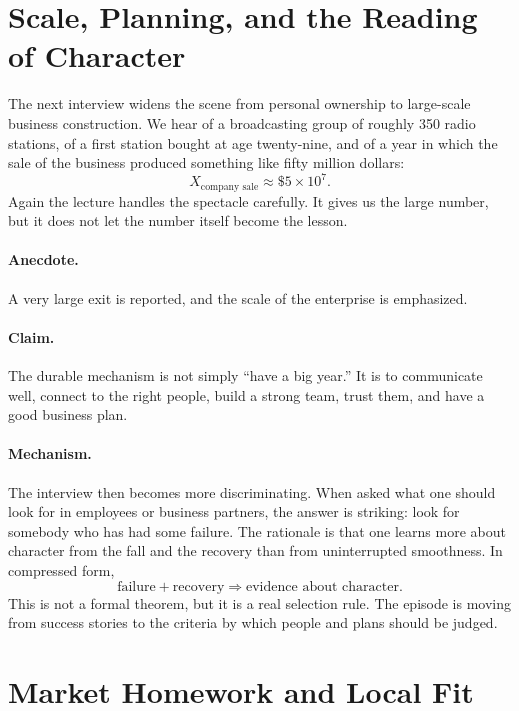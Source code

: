 \section{Scale, Planning, and the Reading of Character}

The next interview widens the scene from personal ownership to large-scale business construction. We hear of a broadcasting group of roughly 350 radio stations, of a first station bought at age twenty-nine, and of a year in which the sale of the business produced something like fifty million dollars:
\begin{equation}
X_{\text{company sale}} \approx \$5\times 10^{7}.
\end{equation}
Again the lecture handles the spectacle carefully. It gives us the large number, but it does not let the number itself become the lesson.

\paragraph{Anecdote.}
A very large exit is reported, and the scale of the enterprise is emphasized.

\paragraph{Claim.}
The durable mechanism is not simply ``have a big year.'' It is to communicate well, connect to the right people, build a strong team, trust them, and have a good business plan.

\paragraph{Mechanism.}
The interview then becomes more discriminating. When asked what one should look for in employees or business partners, the answer is striking: look for somebody who has had some failure. The rationale is that one learns more about character from the fall and the recovery than from uninterrupted smoothness. In compressed form,
\begin{equation}
\text{failure} + \text{recovery} \Longrightarrow \text{evidence about character}.
\end{equation}
This is not a formal theorem, but it is a real selection rule. The episode is moving from success stories to the criteria by which people and plans should be judged.

\section{Market Homework and Local Fit}


